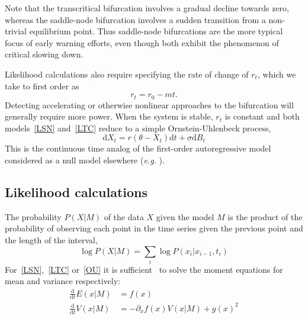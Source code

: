 \documentclass{pnastwo}
\newcommand{\ud}{\mathrm{d}}
\begin{document}
\begin{article}
Note that the transcritical bifurcation involves a gradual decline towards zero,
whereas the saddle-node bifurcation involves a sudden transition from a non-trivial equilibrium point.
Thus saddle-node bifurcations are the more typical focus of early warning efforts, even though both exhibit the phenomenon of critical slowing down.

Likelihood calculations also require specifying the rate of change of $r_t$, 
which we take to first order as
\begin{equation}
r_t = r_0 - m t.
\label{R_t}
\end{equation}
Detecting accelerating or otherwise nonlinear approaches to the bifurcation will generally require more power. 
When the system is stable, $r_t$ is constant and both models~\eqref{LSN} and~\eqref{LTC} reduce to a simple Ornstein-Uhlenbeck process, 
\begin{equation}
\ud X_t = r (\theta - X_t) \ud t + \sigma \ud B_t \label{OU}
\end{equation}
This is the continuous time analog of the first-order autoregressive model considered as a null model elsewhere (\emph{e.g.} \cite{Dakos2008, Guttal2008a}). 

\subsection{Likelihood calculations}\label{likelihood}
The probability $P(X|M)$ of the data $X$ given the model $M$ is the product of the probability of observing each point in the time series given the previous point and the length of the interval,  
\begin{equation}
\log P(X | M)=  \sum_i \log P(x_i | x_{i-1}, t_i)
\end{equation}
For~\eqref{LSN},~\eqref{LTC} or~\eqref{OU} it is sufficient~\cite{Gardiner2009} to solve the moment equations for mean and variance respectively:
\begin{align}
 \frac{\ud }{\ud t} E(x| M)&=  f(x) \\
\frac{\ud}{\ud t} V(x| M) &=  -\partial_x f(x) V(x|M) + g(x)^2 
  \label{general_moments}
\end{align}


\end{article}
\end{document}
